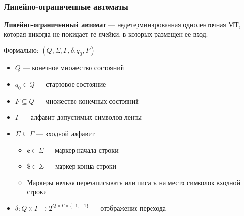 \documentclass{beamer}
\begin{document}
\begin{frame}[fragile]
  \transwipe[direction=90]
  \frametitle{Линейно-ограниченные автоматы}
  \textbf{Линейно-ограниченный автомат} --- недетерминированная одноленточная МТ, которая никогда не покидает те ячейки, в которых размещен ее вход. 
  
  Формально: $(Q, \Sigma, \Gamma, \delta, q_0, F)$
  \begin{itemize}
    \item $Q$ --- конечное множество состояний
    \item $q_0 \in Q$ --- стартовое состояние
    \item $F \subseteq Q$ --- множество конечных состояний
    \item $\Gamma$ --- алфавит допустимых символов ленты
    \item $\Sigma \subseteq \Gamma$ --- входной алфавит
    \begin{itemize}
      \item $\cent \in \Sigma$ --- маркер начала строки
      \item $\$ \in \Sigma$ --- маркер конца строки
      \item Маркеры нельзя перезаписывать или писать на место символов входной строки
    \end{itemize}
    \item $\delta: Q \times \Gamma \rightarrow 2^{Q \times \Gamma \times \{ -1, +1\} }$ --- отображение перехода
  \end{itemize}

\end{frame}
\end{document}
